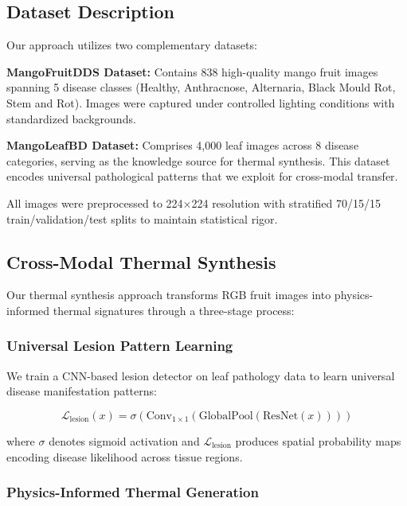 \documentclass[conference]{IEEEtran}
\begin{document}
\subsection{Dataset Description}

Our approach utilizes two complementary datasets:

\textbf{MangoFruitDDS Dataset:} Contains 838 high-quality mango fruit images spanning 5 disease classes (Healthy, Anthracnose, Alternaria, Black Mould Rot, Stem and Rot). Images were captured under controlled lighting conditions with standardized backgrounds.

\textbf{MangoLeafBD Dataset:} Comprises 4,000 leaf images across 8 disease categories, serving as the knowledge source for thermal synthesis. This dataset encodes universal pathological patterns that we exploit for cross-modal transfer.

All images were preprocessed to 224×224 resolution with stratified 70/15/15 train/validation/test splits to maintain statistical rigor.

\subsection{Cross-Modal Thermal Synthesis}

Our thermal synthesis approach transforms RGB fruit images into physics-informed thermal signatures through a three-stage process:

\subsubsection{Universal Lesion Pattern Learning}

We train a CNN-based lesion detector on leaf pathology data to learn universal disease manifestation patterns:

\begin{equation}
    \mathcal{L}_{\text{lesion}}(x) = \sigma(\text{Conv}_{1\times 1}(\text{GlobalPool}(\text{ResNet}(x))))
\end{equation}

where $\sigma$ denotes sigmoid activation and $\mathcal{L}_{\text{lesion}}$ produces spatial probability maps encoding disease likelihood across tissue regions.

\subsubsection{Physics-Informed Thermal Generation}
\end{document}
